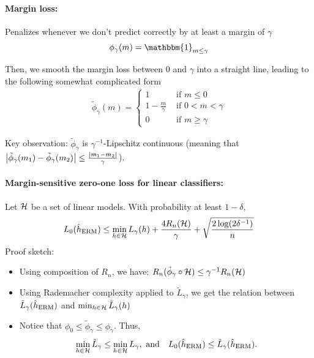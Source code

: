 \paragraph{Margin loss:} Penalizes whenever we don’t predict correctly by at least a margin of $\gamma$
\[ \phi_{\gamma}(m) = \mathbbm{1}_{m \le \gamma} \]

Then, we smooth the margin loss between $0$ and $\gamma$ into a straight line, leading to the following somewhat complicated form
\begin{align*}
    \tilde\phi_{\gamma}(m) %
    = \begin{cases}
        1 & \text{ if } m \le 0 \\
        1 - \frac{m}{\gamma} & \text{ if } 0 < m < \gamma \\
        0 & \text{ if } m \ge \gamma
    \end{cases}
\end{align*}

Key observation: $\tilde\phi_{\gamma}$ is $\gamma^{-1}$-Lipschitz continuous (meaning that ${\left| {\tilde\phi_{\gamma}(m_1) - \tilde\phi_{\gamma}(m_2) } \right|} \le \frac {{\left| {m_1 - m_2} \right|}} {\gamma}$).

\paragraph{Margin-sensitive zero-one loss for linear classifiers:}
Let $\mathcal{H}$ be a set of linear models.
With probability at least $1  - \delta$,
\begin{align*}
    L_0(\hat h_{\textup{ERM}}) \le \min_{h\in\mathcal{H}} L_{\gamma}(h) + \frac {4 R_n (\mathcal{H})} {\gamma} + \sqrt{\frac {2 \log(2\delta^{-1})} n}
\end{align*}
Proof sketch:
\begin{itemize}
    \item Using composition of $R_n$, we have: $R_n(\tilde \phi_{\gamma} \circ \mathcal{H}) \le \gamma^{-1} R_n(\mathcal{H})$
    
    \item Using Rademacher complexity applied to $\tilde L_{\gamma}$, we get the relation between $\tilde L_{\gamma}(\hat h_{\textup{ERM}})$ and $\min_{h\in\mathcal{H}}\tilde L_{\gamma}(h)$

    \item Notice that $\phi_0 \le \tilde \phi_{\gamma} \le \phi_{\gamma}$.
    Thus, \[\min_{h\in\mathcal{H}} \tilde L_{\gamma} \le \min_{h\in\mathcal{H}} L_{\gamma},
    \text{ and }~~ L_0(\hat h_{\textup{ERM}}) \le \tilde L_{\gamma}(\hat h_{\textup{ERM}}). \]
\end{itemize}
\fi

